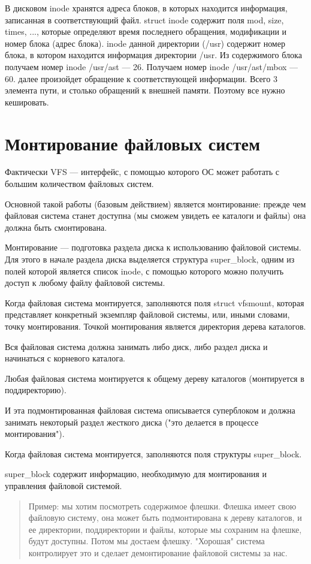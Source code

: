 В дисковом inode хранятся адреса блоков, в которых находится информация, записанная в соответствующий файл. struct inode содержит поля mod, size, times, ..., которые определяют время последнего обращения, модификации и номер блока (адрес блока). inode данной директории (/usr) содержит номер блока, в котором находится информация директории /usr. Из содержимого блока получаем номер inode /usr/ast --- 26. Получаем номер inode /usr/ast/mbox --- 60. далее произойдет обращение к соответствующей информации. Всего 3 элемента пути, и столько обращений к внешней памяти. Поэтому все нужно кешировать.

\section{Монтирование файловых систем}

Фактически VFS — интерфейс, с помощью которого ОС может работать с большим количеством файловых систем.

Основной такой работы (базовым действием) является монтирование: прежде чем файловая система станет доступна (мы сможем увидеть ее каталоги и файлы) она должна быть смонтирована.

Монтирование — подготовка раздела диска к использованию файловой системы. Для этого в начале раздела диска выделяется структура super\_block, одним из полей которой является список inode, с помощью которого можно получить доступ к любому файлу файловой системы.

Когда файловая система монтируется, заполняются поля struct vfsmount, которая представляет конкретный экземпляр файловой системы, или, иными словами, точку монтирования. Точкой монтирования является директория дерева каталогов.

Вся файловая система должна занимать либо диск, либо раздел диска и начинаться с корневого каталога.

Любая файловая система монтируется к общему дереву каталогов (монтируется в поддиректорию).

И эта подмонтированная файловая система описывается суперблоком и должна занимать некоторый раздел жесткого диска ("это делается в процессе монтирования").

Когда файловая система монтируется, заполняются поля структуры super\_block.

super\_block содержит информацию, необходимую для монтирования и управления файловой системой.

\begin{quote}
Пример: мы хотим посмотреть содержимое флешки. Флешка имеет свою файловую систему, она может быть подмонтирована к дереву каталогов, и ее директории, поддиректории и файлы, которые мы сохраним на флешке, будут доступны. Потом мы достаем флешку. "Хорошая" система контролирует это и сделает демонтирование файловой системы за нас.
\end{quote}

